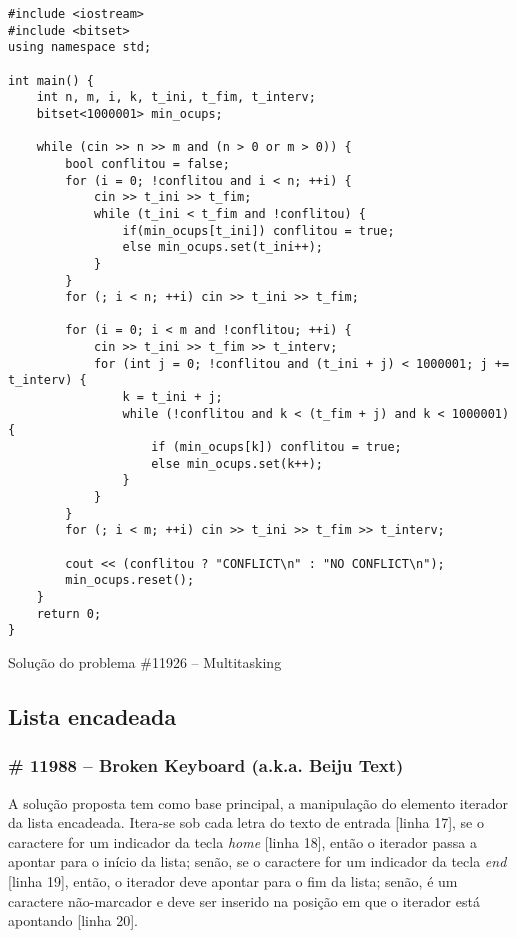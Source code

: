 \documentclass[a4paper,12pt]{scrartcl}
\begin{document}
\begin{listing}[H]
\begin{verbatim}
#include <iostream>
#include <bitset>
using namespace std;

int main() {
    int n, m, i, k, t_ini, t_fim, t_interv;
    bitset<1000001> min_ocups;
    
    while (cin >> n >> m and (n > 0 or m > 0)) {
        bool conflitou = false;
        for (i = 0; !conflitou and i < n; ++i) {
            cin >> t_ini >> t_fim;
            while (t_ini < t_fim and !conflitou) {
                if(min_ocups[t_ini]) conflitou = true;
                else min_ocups.set(t_ini++);
            }
        }
        for (; i < n; ++i) cin >> t_ini >> t_fim;
        
        for (i = 0; i < m and !conflitou; ++i) {
            cin >> t_ini >> t_fim >> t_interv;
            for (int j = 0; !conflitou and (t_ini + j) < 1000001; j += t_interv) {
                k = t_ini + j;
                while (!conflitou and k < (t_fim + j) and k < 1000001) {
                    if (min_ocups[k]) conflitou = true;
                    else min_ocups.set(k++);
                }
            }
        }
        for (; i < m; ++i) cin >> t_ini >> t_fim >> t_interv;
        
        cout << (conflitou ? "CONFLICT\n" : "NO CONFLICT\n");
        min_ocups.reset();
    }
    return 0;
}
\end{verbatim}
\caption{\footnotesize{Solução do problema \#11926 – Multitasking}}
\end{listing}

\subsection{Lista encadeada}
\subsubsection{\# 11988 – Broken Keyboard (a.k.a. Beiju Text)}
A solução proposta tem como base principal, a manipulação do elemento iterador da lista encadeada. Itera-se sob cada letra do texto de entrada [linha 17], se o caractere for um indicador da tecla \textit{home} [linha 18], então o iterador passa a apontar para o início da lista; senão, se o caractere for um indicador da tecla \textit{end} [linha 19], então, o iterador deve apontar para o fim da lista; senão, é um caractere não-marcador e deve ser inserido na posição em que o iterador está apontando [linha 20].
\end{document}
